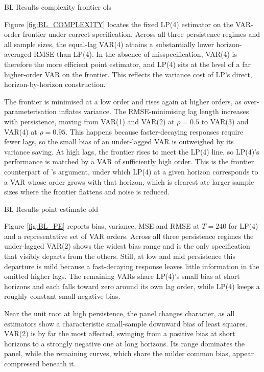 BL Results complexity frontier ols

Figure \ref{fig:BL_COMPLEXITY} locates the fixed LP(4) estimator on the VAR-order frontier under correct specification. 
Across all three persistence regimes and all sample sizes, the equal-lag VAR(4) attains a substantially lower 
horizon-averaged RMSE than LP(4). In the absence of misspecification, VAR(4) is therefore the more efficient point 
estimator, and LP(4) sits at the level of a far higher-order VAR on the frontier. This reflects the variance cost of 
LP's direct, horizon-by-horizon construction.

The frontier is minimised at a low order and rises again at higher orders, as over-parameterisation 
inflates variance. The RMSE-minimising lag length increases with persistence, moving from VAR(1) and VAR(2) at $\rho = 0.5$ to 
VAR(3) and VAR(4) at $\rho = 0.95$. This happens because faster-decaying responses require fewer lags, so the small bias 
of an under-lagged VAR is outweighed by its variance saving. At high lags, the frontier rises to meet the LP(4) 
line, so LP(4)'s performance is matched by a VAR of sufficiently high order. This is the frontier counterpart of 
\textcite{ludwig2026local}'s argument, under which LP(4) at a given horizon corresponds to a VAR whose order grows with 
that horizon, which is clearest atc larger sample sizes where the frontier flattens and noise is reduced.

BL Results point estimate old


Figure \ref{fig:BL_PE} reports bias, variance, MSE and RMSE at $T = 240$ for LP(4) and a representative set of 
VAR orders. Across all three persistence regimes the under-lagged VAR(2) shows the widest bias range and is the 
only specification that visibly departs from the others. Still, at low and mid persistence this departure is 
mild because a fast-decaying response leaves little information in the omitted higher lags. The remaining VARs share 
LP(4)'s small bias at short horizons and each falls toward zero around its own lag order, while LP(4) keeps a roughly 
constant small negative bias. 

Near the unit root at high persistence, the panel changes character, as all estimators show a characteristic small-sample downward bias of 
least squares. VAR(2) is by far the most affected, swinging from a positive bias at short horizons to a strongly 
negative one at long horizons. Its range dominates the panel, while the remaining curves, which share the milder 
common bias, appear compressed beneath it.

